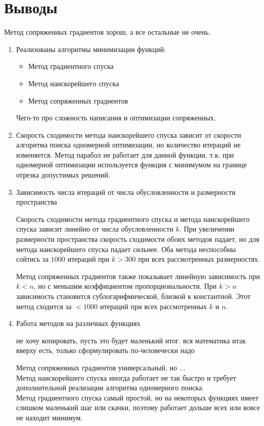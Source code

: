 	
	\section{Выводы}
	Метод сопряженных градиентов хорош, а все остальные не очень. 
	
		\begin{enumerate}
		\item Реализованы алгоритмы минимизации функций:
		\begin{itemize}
			\item Метод градиентного спуска
			\item Метод наискорейшего спуска
			\item Метод сопряженных градиентов
		\end{itemize}
		Чего-то про сложность написания и оптимизации сопряженных.
		
		\item Скорость сходимости метода наискорейшего спуска зависит от скорости алгоритма поиска одномерной оптимизации, но количество итераций не изменяется. Метод парабол не работает для данной функции, т.к. при одномерной оптимизации используется функция с минимумом на границе отрезка допустимых решений.
		
		\item Зависимость числа итераций от числа обусловленности и размерности пространства
		
		Скорость сходимости метода градиентного спуска и метода наискорейшего спуска зависит линейно от числа обусловленности \(k\). При увеличении размерности пространства скорость сходимости обоих методов падает, но для метода наискорейшего спуска падает сильнее. Оба метода неспособны сойтись за \(1000\) итераций при \(k > 300\) при всех рассмотренных размерностях.
	
		Метод сопряженных градиентов также показывает линейную зависимость при \(k < n\), но с меньшим коэффициентом пропорциональности. При \(k > n\) зависимость становится сублогарифмической, близкой к константной. Этот метод сходится за \( < 1000\) итераций при всех рассмотренных \(k\) и \(n\).
		
		\item Работа методов на различных функциях
		
		не хочу копировать, пусть это будет маленький итог. вся математика итак вверху есть, только сформулировать по-человечески надо 
		
		Метод сопряженных градиентов универсальный, но ...\\
		Метод наискорейшего спуска иногда работает не так быстро и требует дополнительной реализации алгоритма одномерного поиска.\\
		Метод градиентного спуска самый простой, но на некоторых функциях имеет слишком маленький шаг или скачки, поэтому работает дольше всех или вовсе не находит минимум. 
		
	\end{enumerate}

